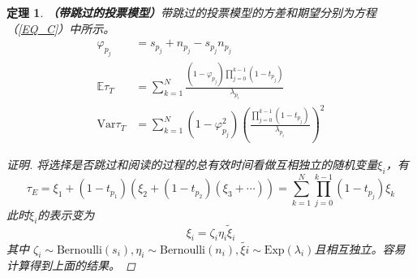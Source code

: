 \documentclass[UTF8]{ctexart}
\theoremstyle{plain}
\newtheorem{thm}{定理}[section]
\theoremstyle{definition}
\theoremstyle{remark}
\begin{document}
	\begin{thm}\textbf{（带跳过的投票模型）}带跳过的投票模型的方差和期望分别为方程（\ref{EQ_C}）中所示。
		\begin{equation*} 
		\begin{aligned}
		\varphi_{p_j} & = s_{p_j} + n_{p_j} - s_{p_j}n_{p_j} \\
		\mathbb{E} \tau_T & = \sum_{k=1}^N \frac{(1-\varphi_{p_j})\prod\limits_{j=0}^{k-1}(1-t_{p_j})}{\lambda_{p_i}} \\
		\mathrm{Var} \tau_T & = \sum_{k=1}^N (1-\varphi_{p_j}^2)\left(\frac{\prod\limits_{j=0}^{k-1}(1-t_{p_j})}{\lambda_{p_i}}\right)^2
		\end{aligned}
		\end{equation*}
		\begin{proof}[证明]
			将选择是否跳过和阅读的过程的总有效时间看做互相独立的随机变量$\xi_i$，有
			$$
			\tau_E = \xi_1 + (1-t_{p_1})(\xi_2 + (1-t_{p_2})(\xi_3+\cdots)) = \sum_{k=1}^N \prod_{j=0}^{k-1} (1-t_{p_j}) \xi_k
			$$
			此时$\xi_i$的表示变为
			$$
			\xi_i = \zeta_i \eta_i \tilde{\xi}_i
			$$
			其中
			$\zeta_i \sim \mathrm{Bernoulli}(s_i), \eta_i \sim \mathrm{Bernoulli}(n_i), \tilde{\xi{i}} \sim \mathrm{Exp}(\lambda_i)$且相互独立。容易计算得到上面的结果。
		\end{proof}
	\end{thm}
\end{document}
